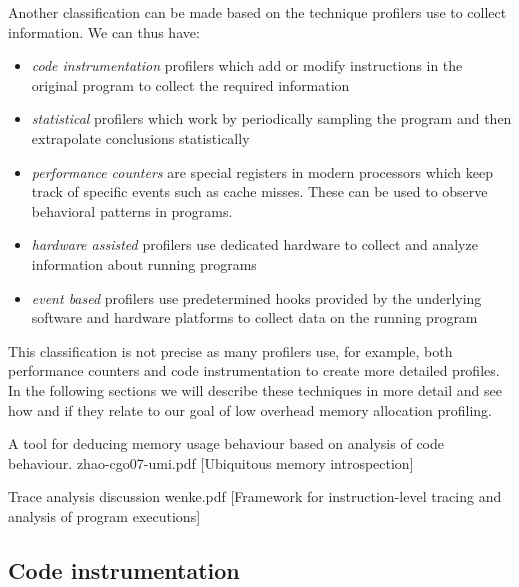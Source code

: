 Another classification can be made based on the technique profilers use to collect information. We can thus have:
\begin{itemize}
\item \textit{code instrumentation} profilers which add or modify instructions in the original program to collect the required information
\item \textit{statistical} profilers which work by periodically sampling the program and then extrapolate conclusions statistically
\item \textit{performance counters} are special registers in modern processors which keep track of specific events such as cache misses. These can be used to observe behavioral patterns in programs.
\item \textit{hardware assisted} profilers use dedicated hardware to collect and analyze information about running programs
\item \textit{event based} profilers use predetermined hooks provided by the underlying software and hardware platforms to collect data on the running program
\end{itemize}

This classification is not precise as many profilers use, for example, both performance counters and code instrumentation to create more detailed profiles. In the following sections we will describe these techniques in more detail and see how and if they relate to our goal of low overhead memory allocation profiling.

A tool for deducing memory usage behaviour based on analysis of code behaviour.
zhao-cgo07-umi.pdf [Ubiquitous memory introspection]

Trace analysis discussion
wenke.pdf [Framework for instruction-level tracing and analysis of program executions]

\subsection{Code instrumentation}
\label{subsection:codeinstrumentation}

